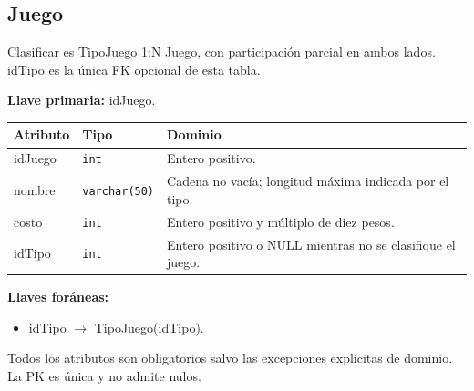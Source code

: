 \par\noindent\begin{minipage}{\textwidth}
\subsection{Juego}
Clasificar es TipoJuego 1:N Juego, con participación parcial en ambos lados. idTipo es la única FK opcional de esta tabla.\par
\textbf{Llave primaria:} idJuego.\par
{\small\begin{tabular}{@{}p{}p{}p{}@{}}
\toprule Atributo & Tipo & Dominio \\ \midrule
idJuego & \texttt{int} & Entero positivo. \\
nombre & \texttt{varchar(50)} & Cadena no vacía; longitud máxima indicada por el tipo. \\
costo & \texttt{int} & Entero positivo y múltiplo de diez pesos. \\
idTipo & \texttt{int} & Entero positivo o NULL mientras no se clasifique el juego. \\
\bottomrule\end{tabular}}
\textbf{Llaves foráneas:}\begin{itemize}[nosep]
\item idTipo $\rightarrow$ TipoJuego(idTipo).
\end{itemize}
Todos los atributos son obligatorios salvo las excepciones explícitas de dominio. La PK es única y no admite nulos.
\end{minipage}\par\vspace{.35cm}
